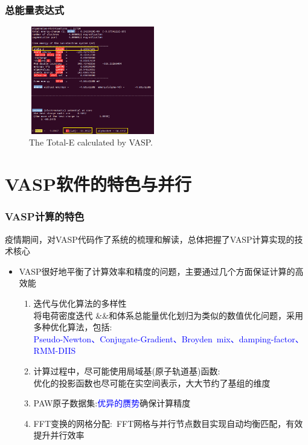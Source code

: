 \documentclass[cjk,slidestop,handout,compress,mathserif,blue]{beamer}	%
\begin{document}
\frame
{
	\frametitle{总能量表达式}
\fontsize{6.5pt}{4.2pt}
\begin{figure}[h!]
\centering
\vspace*{-0.18in}
\includegraphics[height=1.85in,width=2.2in,viewport=0 0 600 495,clip]{Figures/VASP_Total_ENE.png}
\caption{\small \textrm{The Total-E calculated by VASP.}}%
\label{TOTEN_VASP}
\end{figure}
}

\section{\rm{VASP}软件的特色与并行}
\frame
{
	\frametitle{\textrm{VASP}计算的特色}
		疫情期间，对\textrm{VASP}代码作了系统的梳理和解读，总体把握了\textrm{VASP}计算实现的技术核心
	\begin{itemize}
		\item \textrm{VASP}很好地平衡了计算效率和精度的问题，主要通过几个方面保证计算的高效能
	\begin{enumerate}
	     \item 迭代与优化算法的多样性\\
		     将电荷密度迭代 \textrm{\&\&}和体系总能量优化划归为类似的数值优化问题，采用多种优化算法，包括:\\
			\textcolor{blue}{\textrm{Pseudo-Newton、Conjugate-Gradient、Broyden~mix、damping-factor、RMM-DIIS}}
	     \item 计算过程中，尽可能使用局域基(原子轨道基)函数:~\\
		     优化的投影函数也尽可能在实空间表示，大大节约了基组的维度
	     \item \textrm{PAW}原子数据集:\textcolor{blue}{优异的赝势}确保计算精度
	     \item \textrm{FFT}变换的网格分配:~\textrm{FFT}网格与并行节点数目实现自动均衡匹配，有效提升并行效率
	\end{enumerate}
	\end{itemize}
}
\end{document}
